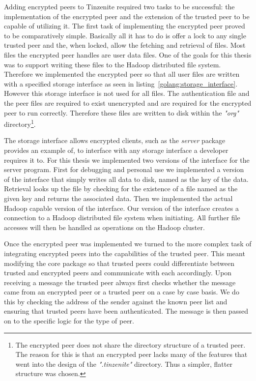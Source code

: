 Adding encrypted peers to Tinzenite required two tasks to be successful: the implementation of the encrypted peer and the extension of the trusted peer to be capable of utilizing it.
The first task of implementing the encrypted peer proved to be comparatively simple.
Basically all it has to do is offer a lock to any single trusted peer and the, when locked, allow the fetching and retrieval of files.
Most files the encrypted peer handles are user data files.
One of the goals for this thesis was to support writing these files to the Hadoop distributed file system.
Therefore we implemented the encrypted peer so that all user files are written with a specified storage interface as seen in listing~\ref{golang:storage_interface}.
However this storage interface is not used for all files.
The authentication file and the peer files are required to exist unencrypted and are required for the encrypted peer to run correctly.
Therefore these files are written to disk within the \textit{"org"} directory\footnote{The encrypted peer does not share the directory structure of a trusted peer. The reason for this is that an encrypted peer lacks many of the features that went into the design of the \textit{".tinzenite"} directory. Thus a simpler, flatter structure was chosen.}.

The storage interface allows encrypted clients, such as the \emph{server} package provides an example of, to interface with any storage interface a developer requires it to.
For this thesis we implemented two versions of the interface for the server program.
First for debugging and personal use we implemented a version of the interface that simply writes all data to disk, named as the key of the data.
Retrieval looks up the file by checking for the existence of a file named as the given key and returns the associated data.
Then we implemented the actual Hadoop capable version of the interface.
Our version of the interface creates a connection to a Hadoop distributed file system when initiating.
All further file accesses will then be handled as operations on the Hadoop cluster.

Once the encrypted peer was implemented we turned to the more complex task of integrating encrypted peers into the capabilities of the trusted peer.
This meant modifying the core package so that trusted peers could differentiate between trusted and encrypted peers and communicate with each accordingly.
Upon receiving a message the trusted peer always first checks whether the message came from an encrypted peer or a trusted peer on a case by case basis.
We do this by checking the address of the sender against the known peer list and ensuring that trusted peers have been authenticated.
The message is then passed on to the specific logic for the type of peer.

